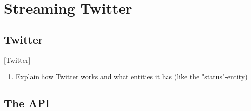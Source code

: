 \chapter{Streaming Twitter}
\label{ch:twitterStreaming}

\section{Twitter}[Twitter]
\label{sec:twitter}

\begin{enumerate}
    \item
    Explain how Twitter works and what entities it has (like the "status"-entity)
\end{enumerate}

\section{The API}
\label{sec:theApi}

